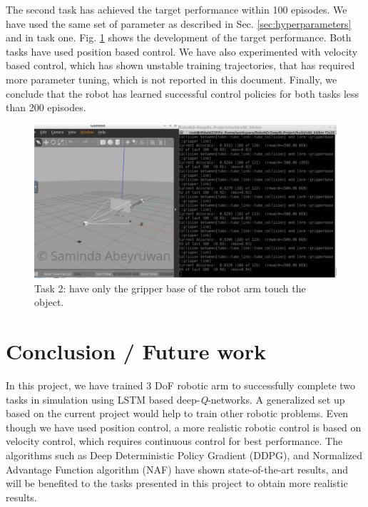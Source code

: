 \documentclass[10pt,journal,compsoc]{IEEEtran}
\begin{document}
The second task has achieved the target performance within 100 episodes. We have used the same set of parameter as described in Sec. \ref{sec:hyperparameters} and in task one. Fig. \ref{fig:task2} shows the development of the target performance. Both tasks have used position based control. We have also experimented with velocity based control, which has shown unstable training trajectories, that has required more parameter tuning, which is not reported in this document. Finally, we conclude that  the robot has learned successful control policies for both tasks less than 200 episodes.

\begin{figure}[thpb]
      \centering
      \includegraphics[width=\linewidth]{task2}
      \caption{Task 2: have only the gripper base of the robot arm touch the object.}
      \label{fig:task2}
\end{figure}


\section{Conclusion / Future work}

In this project, we have trained 3 DoF robotic arm to successfully complete two tasks in simulation using  LSTM based deep-\textit{Q}-networks. A generalized set up based on the current project would help to train other robotic problems. Even though we have used position control, a more realistic robotic control is based on velocity control, which requires continuous control for best performance. The algorithms such as Deep Deterministic Policy Gradient (DDPG), and Normalized Advantage Function algorithm (NAF)  \cite{GuHolLilLev17} have shown state-of-the-art results, and will be benefited to the tasks presented in this project to obtain more realistic results. 




\end{document}

